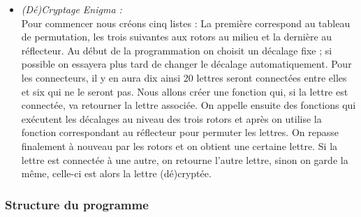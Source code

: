 \documentclass[a4paper,12pt,abstracton,titlepage]{scrartcl}
\begin{document}
\begin{itemize}
\item \textit{(Dé)Cryptage Enigma :}\\
Pour commencer nous créons cinq listes : La première correspond au tableau de permutation, les trois suivantes aux rotors au milieu et la dernière au réflecteur. Au début de la programmation on choisit un décalage fixe ; si possible on essayera plus tard de changer le décalage automatiquement.
Pour les connecteurs, il y en aura dix ainsi 20 lettres seront connectées entre elles et six qui ne le seront pas. Nous allons créer une fonction qui, si la lettre est connectée, va retourner la lettre associée.
On appelle ensuite des fonctions qui exécutent les décalages au niveau des trois rotors et après on utilise la fonction correspondant au réflecteur pour permuter les lettres. On repasse finalement à nouveau par les rotors et on obtient une certaine lettre. Si la lettre est connectée à une autre, on retourne l’autre lettre, sinon on garde la même, celle-ci est alors la lettre (dé)cryptée.\\
\end{itemize}

\newpage
\subsubsection{Structure du programme}
\end{document}
